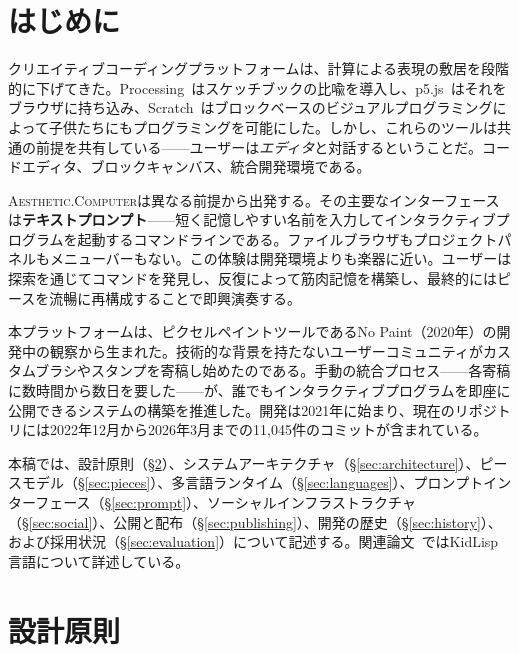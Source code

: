 \documentclass[10pt,letterpaper,twocolumn]{article}
\newcommand{\ac}{\textsc{Aesthetic.Computer}}
\begin{document}

\section{はじめに}

クリエイティブコーディングプラットフォームは、計算による表現の敷居を段階的に下げてきた。Processing~\citep{reas2007processing}はスケッチブックの比喩を導入し、p5.js~\citep{mccarthy2015p5js}はそれをブラウザに持ち込み、Scratch~\citep{resnick2009scratch}はブロックベースのビジュアルプログラミングによって子供たちにもプログラミングを可能にした。しかし、これらのツールは共通の前提を共有している——ユーザーは\emph{エディタ}と対話するということだ。コードエディタ、ブロックキャンバス、統合開発環境である。

\ac{}は異なる前提から出発する。その主要なインターフェースは\textbf{テキストプロンプト}——短く記憶しやすい名前を入力してインタラクティブプログラムを起動するコマンドラインである。ファイルブラウザもプロジェクトパネルもメニューバーもない。この体験は開発環境よりも楽器に近い。ユーザーは探索を通じてコマンドを発見し、反復によって筋肉記憶を構築し、最終的にはピースを流暢に再構成することで即興演奏する。

本プラットフォームは、ピクセルペイントツールであるNo Paint（2020年）の開発中の観察から生まれた。技術的な背景を持たないユーザーコミュニティがカスタムブラシやスタンプを寄稿し始めたのである。手動の統合プロセス——各寄稿に数時間から数日を要した——が、誰でもインタラクティブプログラムを即座に公開できるシステムの構築を推進した。開発は2021年に始まり、現在のリポジトリには2022年12月から2026年3月までの11,045件のコミットが含まれている。

本稿では、設計原則（\S\ref{sec:principles}）、システムアーキテクチャ（\S\ref{sec:architecture}）、ピースモデル（\S\ref{sec:pieces}）、多言語ランタイム（\S\ref{sec:languages}）、プロンプトインターフェース（\S\ref{sec:prompt}）、ソーシャルインフラストラクチャ（\S\ref{sec:social}）、公開と配布（\S\ref{sec:publishing}）、開発の歴史（\S\ref{sec:history}）、および採用状況（\S\ref{sec:evaluation}）について記述する。関連論文~\citep{scudder2026kidlisp}ではKidLisp言語について詳述している。


\section{設計原則}
\label{sec:principles}
\end{document}

